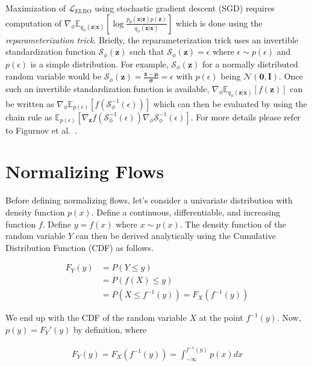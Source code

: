 \documentclass[runningheads]{llncs}
\begin{document}
Maximization of $\mathcal{L}_{\mathrm{ELBO}}$ using stochastic gradient descent (SGD) requires computation of $\nabla_\phi \mathbb{E}_{q_\phi(\mathbf{z}|\mathbf{x})}\left[\log\frac{p_\theta(\mathbf{x}| \mathbf{z})p(\mathbf{z})}{q_\phi(\mathbf{z}|\mathbf{x})}\right]$ which is done using the \textit{reparameterization trick}. Briefly, the reparameterization trick uses an invertible standardization function $\mathcal{S}_{\phi}(\mathbf{z})$ such that $\mathcal{S}_{\phi}(\mathbf{z}) = \epsilon$ where $\epsilon \sim p(\epsilon)$ and $p(\epsilon)$ is a simple distribution. For example, $\mathcal{S}_{\phi}(\mathbf{z})$ for a normally distributed random variable would be $\mathcal{S}_{\phi}(\mathbf{z}) = \frac{\mathbf{z}-\bm{\mu}}{\bm{\sigma}} = \epsilon$ with $p(\epsilon)$ being $\mathcal{N}(\bm{0}, \mathbf{I})$. Once such an invertible standardization function is available, $\nabla_\phi \mathbb{E}_{q_\phi(\mathbf{z}|\mathbf{x})}\left[f(\mathbf{z})\right]$ can be written as $\nabla_\phi \mathbb{E}_{p(\epsilon)}\left[f(\mathcal{S}_{\phi}^{-1}(\epsilon))\right]$ which can then be evaluated by using the chain rule as $ \mathbb{E}_{p(\epsilon)}\left[\nabla_{\mathbf{z}}f(\mathcal{S}_{\phi}^{-1}(\epsilon))\nabla_\phi\mathcal{S}_{\phi}^{-1}(\epsilon)\right]$. For more details please refer to Figurnov et al.~\cite{figurnov2018implicit}.

\section{Normalizing Flows}

Before defining normalizing flows, let's consider a univariate distribution with density function $p(x)$. Define a continuous, differentiable, and increasing function $f$. Define $y = f(x)$ where $x \sim p(x)$. The density function of the random variable $Y$ can then be derived analytically using the Cumulative Distribution Function (CDF) as follows.

\begin{align}
F_{Y}(y) &= P(Y \leq y)\\
&= P(f(X) \leq y)\\
&= P(X \leq f^{-1}(y)) = F_{X}( f^{-1}(y))
\end{align}

We end up with the CDF of the random variable $X$ at the point $f^{-1}(y)$. Now, $p(y) = F_{Y}'(y)$ by definition, where

\begin{align}
F_{Y}(y) = F_{X}( f^{-1}(y)) = \int_{-\infty}^{ f^{-1}(y)}p(x) dx
\label{eq:cdfy}
\end{align}
\end{document}
